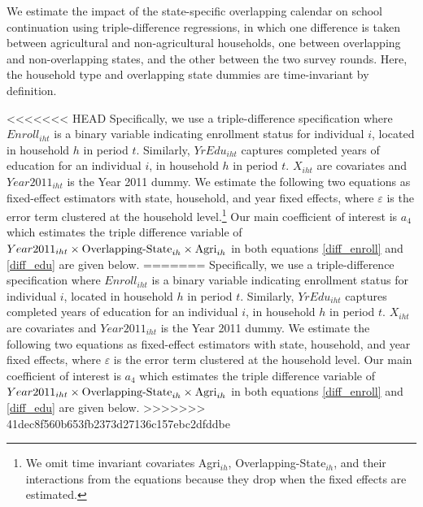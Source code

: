 \documentclass[12pt,letterpaper]{article}
\newcommand{\0}{\ensuremath{\mbox{\boldmath $0$}}}
\begin{document}
We estimate the impact of the state-specific overlapping calendar on school continuation using triple-difference regressions, in which one difference is taken between agricultural and non-agricultural households, one between overlapping and non-overlapping states, and the other between the two survey rounds. Here, the household type and overlapping state dummies are time-invariant by definition.

<<<<<<< HEAD
Specifically, we use a triple-difference specification where ${Enroll}_{iht}$ is a binary variable indicating enrollment status for individual $i$, located in household $h$ in period $t$. Similarly, ${YrEdu}_{iht}$ captures completed years of education for an individual $i$, in household $h$ in period $t$. ${X}_{iht}$ are covariates and ${Year2011}_{iht}$ is the Year 2011 dummy. We estimate the following two equations as fixed-effect estimators with state, household, and year fixed effects, where $\varepsilon$ is the error term clustered at the household level.\footnote{We omit time invariant covariates Agri$_{ih}$, Overlapping-State$_{ih}$, and their interactions from the equations because they drop when the fixed effects are estimated. } Our main coefficient of interest is $a_4$ which estimates the triple difference variable of ${Year2011}_{iht}\times \textnormal{Overlapping-State}_{ih}\times\textnormal{Agri}_{ih}$ in both equations \ref{diff_enroll} and \ref{diff_edu} are given below.
=======
Specifically, we use a triple-difference specification where ${Enroll}_{iht}$ is a binary variable indicating enrollment status for individual $i$, located in household $h$ in period $t$. Similarly, ${YrEdu}_{iht}$ captures completed years of education for an individual $i$, in household $h$ in period $t$. ${X}_{iht}$ are covariates and ${Year2011}_{iht}$ is the Year 2011 dummy. We estimate the following two equations as fixed-effect estimators with state, household, and year fixed effects, where $\varepsilon$ is the error term clustered at the household level. Our main coefficient of interest is $a_4$ which estimates the triple difference variable of ${Year2011}_{iht}\times \textnormal{Overlapping-State}_{ih}\times\textnormal{Agri}_{ih}$ in both equations \ref{diff_enroll} and \ref{diff_edu} are given below.
>>>>>>> 41dec8f560b653fb2373d27136c157ebc2dfddbe
\end{document}
